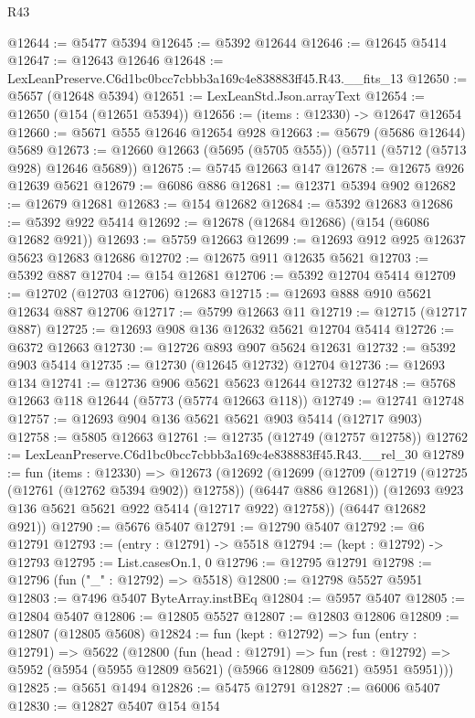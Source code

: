 \begin{lexlean}{R43}
\begin{coremodule}
@12644 := @5477 @5394
@12645 := @5392 @12644
@12646 := @12645 @5414
@12647 := @12643 @12646
@12648 := LexLeanPreserve.C6d1bc0bcc7cbbb3a169c4e838883ff45.R43.__fits_13
@12650 := @5657 (@12648 @5394)
@12651 := LexLeanStd.Json.arrayText
@12654 := @12650 (@154 (@12651 @5394))
@12656 := (items : @12330) -> @12647 @12654
@12660 := @5671 @555 @12646 @12654 @928
@12663 := @5679 (@5686 @12644) @5689
@12673 := @12660 @12663 (@5695 (@5705 @555)) (@5711 (@5712 (@5713 @928) @12646 @5689))
@12675 := @5745 @12663 @147
@12678 := @12675 @926 @12639 @5621
@12679 := @6086 @886
@12681 := @12371 @5394 @902
@12682 := @12679 @12681
@12683 := @154 @12682
@12684 := @5392 @12683
@12686 := @5392 @922 @5414
@12692 := @12678 (@12684 @12686) (@154 (@6086 @12682 @921))
@12693 := @5759 @12663
@12699 := @12693 @912 @925 @12637 @5623 @12683 @12686
@12702 := @12675 @911 @12635 @5621
@12703 := @5392 @887
@12704 := @154 @12681
@12706 := @5392 @12704 @5414
@12709 := @12702 (@12703 @12706) @12683
@12715 := @12693 @888 @910 @5621 @12634 @887 @12706
@12717 := @5799 @12663 @11
@12719 := @12715 (@12717 @887)
@12725 := @12693 @908 @136 @12632 @5621 @12704 @5414
@12726 := @6372 @12663
@12730 := @12726 @893 @907 @5624 @12631
@12732 := @5392 @903 @5414
@12735 := @12730 (@12645 @12732) @12704
@12736 := @12693 @134
@12741 := @12736 @906 @5621 @5623 @12644 @12732
@12748 := @5768 @12663 @118 @12644 (@5773 (@5774 @12663 @118))
@12749 := @12741 @12748
@12757 := @12693 @904 @136 @5621 @5621 @903 @5414 (@12717 @903)
@12758 := @5805 @12663
@12761 := @12735 (@12749 (@12757 @12758))
@12762 := LexLeanPreserve.C6d1bc0bcc7cbbb3a169c4e838883ff45.R43.__rel_30
@12789 := fun (items : @12330) =>
  @12673
    (@12692
      (@12699
        (@12709 (@12719 (@12725 (@12761 (@12762 @5394 @902)) @12758)) (@6447 @886 @12681))
        (@12693 @923 @136 @5621 @5621 @922 @5414 (@12717 @922) @12758))
      (@6447 @12682 @921))
@12790 := @5676 @5407
@12791 := @12790 @5407
@12792 := @6 @12791
@12793 := (entry : @12791) -> @5518
@12794 := (kept : @12792) -> @12793
@12795 := List.casesOn.{1, 0}
@12796 := @12795 @12791
@12798 := @12796 (fun ("_" : @12792) => @5518)
@12800 := @12798 @5527 @5951
@12803 := @7496 @5407 ByteArray.instBEq
@12804 := @5957 @5407
@12805 := @12804 @5407
@12806 := @12805 @5527
@12807 := @12803 @12806
@12809 := @12807 (@12805 @5608)
@12824 := fun (kept : @12792) =>
  fun (entry : @12791) =>
  @5622
    (@12800
      (fun (head : @12791) =>
      fun (rest : @12792) => @5952 (@5954 (@5955 @12809 @5621) (@5966 @12809 @5621) @5951 @5951)))
@12825 := @5651 @1494
@12826 := @5475 @12791
@12827 := @6006 @5407
@12830 := @12827 @5407 @154 @154

\end{coremodule}
\end{lexlean}
